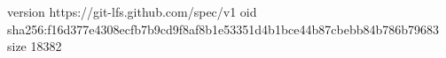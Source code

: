 version https://git-lfs.github.com/spec/v1
oid sha256:f16d377e4308ecfb7b9cd9f8af8b1e53351d4b1bce44b87cbebb84b786b79683
size 18382
